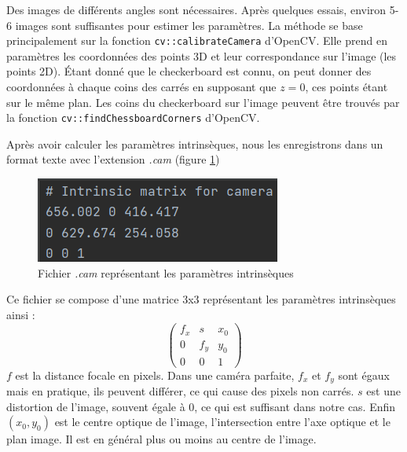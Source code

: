             Des images de différents angles sont nécessaires. Après quelques essais, environ 5-6 images sont suffisantes pour estimer les paramètres. La méthode se base principalement sur la fonction \verb|cv::calibrateCamera| d'OpenCV. Elle prend en paramètres les coordonnées des points 3D et leur correspondance sur l'image (les points 2D). Étant donné que le checkerboard est connu, on peut donner des coordonnées à chaque coins des carrés en supposant que $z=0$, ces points étant sur le même plan. Les coins du checkerboard sur l'image peuvent être trouvés par la fonction \verb|cv::findChessboardCorners| d'OpenCV.

            Après avoir calculer les paramètres intrinsèques, nous les enregistrons dans un format texte avec l'extension \emph{.cam} (figure \ref{fig:cam})

            \begin{figure}[!h]
                \centering
                \includegraphics[scale=0.8]{img/rendu/cam.png}
                \caption{Fichier \emph{.cam} représentant les paramètres intrinsèques}
                \label{fig:cam}
            \end{figure}

            Ce fichier se compose d'une matrice 3x3 représentant les paramètres intrinsèques ainsi :
            \begin{equation*}
                \begin{pmatrix}
                    f_x & s & x_0 \\
                    0 & f_y & y_0 \\
                    0 & 0 & 1
                \end{pmatrix}
            \end{equation*}
            $f$ est la distance focale en pixels. Dans une caméra parfaite, $f_x$ et $f_y$ sont égaux mais en pratique, ils peuvent différer, ce qui cause des pixels non carrés. $s$ est une distortion de l'image, souvent égale à 0, ce qui est suffisant dans notre cas. Enfin $(x_0, y_0)$ est le centre optique de l'image, l'intersection entre l'axe optique et le plan image. Il est en général plus ou moins au centre de l'image. 

